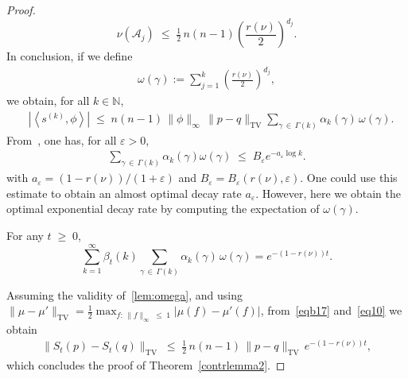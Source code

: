 \documentclass[AHL,Unicode,longabstracts,published]{cedram}
\renewcommand{\leq}{\;\leqslant\;}
\renewcommand{\geq}{\;\geqslant\;}
\newcommand{\e}{\varepsilon}
\newcommand{\tv}{\mathrm{TV}}
\newcommand{\cA}{\mathcal{A}}
\newcommand{\bbN}{\mathbb{N}}
\let\b=\beta
\let\e=\varepsilon
\let\g=\gamma
\let\o=\omega
\begin{document}
\begin{proof}
\[
\nu(\cA_j)\leq \tfrac12\,n(n-1)\left(\frac{r(\nu)}{2}\right)^{d_j}.
\]
In conclusion, if we define
\begin{align}\label{eqomegagamma}
\o(\gamma):=\sum_{j=1}^k\left(\frac{r(\nu)}{2}\right)^{d_j},
\end{align}
we obtain, for all $k\in\bbN$,
\begin{align}\label{eq10}
& \left|\left\langle s^{(k)},\phi\right\rangle\right|\leq{n(n-1)}\,\|\phi\|_\infty\,\|p-q\|_\tv \sum_{\gamma\,\in\,\Gamma(k)}\alpha_k(\gamma)
\,\o(\g).
\end{align}
From~\cite[Lemma~1.4]{carlenwild}, one has, for all $\e>0$,
\begin{align}\label{carlenwildestimation}
\sum_{\gamma\,\in\,\Gamma(k)}\alpha_k(\gamma)\o(\gamma) \leq B_\e e^{-a_\e\log k}.
\end{align}
with $a_\e=(1-r(\nu))/(1+\e)$ and $B_\e=B_\e(r(\nu),\e)$. One could use this estimate to obtain an almost optimal decay rate $a_\e$. However, here we obtain the optimal exponential decay rate by computing the expectation of $\o(\g)$.

\begin{lemm}\label{lemma:omega}
For any $t\geq 0$,
\begin{equation}\label{lem:omega}
\sum_{k=1}^{\infty}\b_t(k)\sum_{\g\,\in \,\Gamma(k)}\alpha_k(\g)\,\o(\gamma) = e^{-(1-r(\nu))t}.
\end{equation}
\end{lemm}

Assuming the validity of~\eqref{lem:omega}, and using $\|\mu-\mu'\|_\tv = \tfrac12 \max_{f:\,\|f\|_\infty\leq 1} |\mu(f)-\mu'(f)|$, from~\eqref{eqb17} and~\eqref{eq10} we obtain
\begin{align}\label{eqabb17}
\|S_t(p) - S_t(q)\|_\tv
\leq \tfrac12\,n(n-1)\,\|p-q\|_\tv \,e^{-(1-r(\nu))t},
\end{align}
which concludes the proof of Theorem~\ref{contrlemma2}.


\end{proof}
\end{document}
